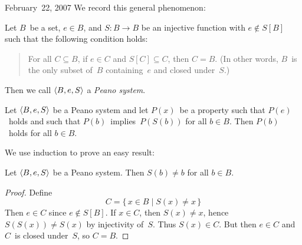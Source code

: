 \begin{lecture}{February~22, 2007}
We record this general phenomenon:
\begin{defn}
Let \(B\)~be a set, \(e\in B\), and \(S:B\to B\) be an injective function with \(e\not\in S[B]\) such that the following condition holds:
\begin{quote}
For all \(C\subseteq B\), if \(e\in C\) and \(S[C]\subseteq C\), then \(C=B\). (In other words, \(B\)~is the only subset of~\(B\) containing~\(e\) and closed under~\(S\).)
\end{quote}
Then we call \(\langle{B},{{e},{S}}\rangle\) a \emph{Peano system}.
\end{defn}
\begin{thm}
Let \(\langle{B},{{e},{S}}\rangle\) be a Peano system and let \(P(x)\)~be a property such that \(P(e)\)~holds and such that \(P(b)\)~implies~\(P(S(b))\) for all \(b\in B\). Then \(P(b)\)~holds for all \(b\in B\).
\end{thm}
\noindent We use induction to prove an easy result:
\begin{cor}
Let \(\langle{B},{{e},{S}}\rangle\) be a Peano system. Then \(S(b)\ne b\) for all \(b\in B\).
\end{cor}
\begin{proof}
Define
\[C=\{\,x\in B\mid S(x)\ne x\,\}\]
Then \(e\in C\) since \(e\not\in S[B]\). If \(x\in C\), then \(S(x)\ne x\), hence \(S(S(x))\ne S(x)\) by injectivity of~\(S\). Thus \(S(x)\in C\). But then \(e\in C\) and \(C\)~is closed under~\(S\), so \(C=B\).
\end{proof}
\end{lecture}

